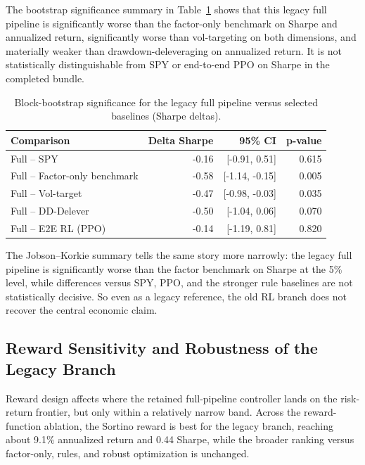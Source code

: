 \documentclass[10pt,twocolumn]{article}
\begin{document}
The bootstrap significance summary in Table~\ref{tab:legacy_bootstrap_significance}
shows that this legacy full pipeline is significantly worse than the
factor-only benchmark on Sharpe and annualized return, significantly worse than
vol-targeting on both dimensions, and materially weaker than
drawdown-deleveraging on annualized return. It is not statistically
distinguishable from SPY or end-to-end PPO on Sharpe in the completed bundle.

\begin{table}[t]
\centering
\caption{Block-bootstrap significance for the legacy full pipeline versus
selected baselines (Sharpe deltas).}
\label{tab:legacy_bootstrap_significance}
\small
\begin{tabular}{@{} p{} r r r @{}}
\toprule
\textbf{Comparison} & \textbf{Delta Sharpe} & \textbf{95\% CI} & \textbf{p-value} \\
\midrule
Full -- SPY                   & -0.16 & [-0.91, 0.51] & 0.615 \\
Full -- Factor-only benchmark & -0.58 & [-1.14, -0.15] & 0.005 \\
Full -- Vol-target            & -0.47 & [-0.98, -0.03] & 0.035 \\
Full -- DD-Delever            & -0.50 & [-1.04, 0.06] & 0.070 \\
Full -- E2E RL (PPO)          & -0.14 & [-1.19, 0.81] & 0.820 \\
\bottomrule
\end{tabular}
\end{table}

The Jobson--Korkie summary tells the same story more narrowly: the legacy full
pipeline is significantly worse than the factor benchmark on Sharpe at the
5\% level, while differences versus SPY, PPO, and the stronger rule baselines
are not statistically decisive. So even as a legacy reference, the old RL
branch does not recover the central economic claim.

\subsection{Reward Sensitivity and Robustness of the Legacy Branch}

Reward design affects where the retained full-pipeline controller lands on the
risk-return frontier, but only within a relatively narrow band. Across the
reward-function ablation, the Sortino reward is best for the legacy branch,
reaching about 9.1\% annualized return and 0.44 Sharpe, while the broader
ranking versus factor-only, rules, and robust optimization is unchanged.
\end{document}

